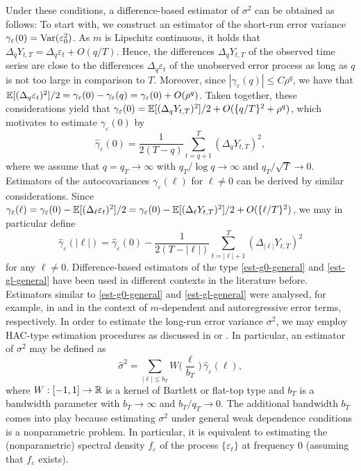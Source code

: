 Under these conditions, a difference-based estimator of $\sigma^2$ can be obtained as follows: To start with, we construct an estimator of the short-run error variance $\gamma_\varepsilon(0) = \textnormal{Var}(\varepsilon_0^2)$. As $m$ is Lipschitz continuous, it holds that $\Delta_q Y_{t,T} = \Delta_q \varepsilon_t + O(q/T)$. Hence, the differences $\Delta_q Y_{t,T}$ of the observed time series are close to the differences $\Delta_q \varepsilon_t$ of the unobserved error process as long as $q$ is not too large in comparison to $T$. Moreover, since $|\gamma_\varepsilon(q)| \le C \rho^{q}$, we have that $\mathbb{E}[(\Delta_q \varepsilon_t)^2]/2 = \gamma_\varepsilon(0) - \gamma_\varepsilon(q) = \gamma_\varepsilon(0) + O(\rho^q)$. Taken together, these considerations yield that $\gamma_\varepsilon(0) = \mathbb{E}[(\Delta_q Y_{t,T})^2]/2 + O(\{q/T\}^2 + \rho^q)$, which motivates to estimate $\gamma_\varepsilon(0)$ by  
\begin{equation}\label{est-g0-general}
\widehat{\gamma}_\varepsilon(0) = \frac{1}{2(T-q)} \sum\limits_{t=q+1}^T (\Delta_q Y_{t,T})^2,
\end{equation}
where we assume that $q = q_T \rightarrow \infty$ with $q_T/\log q \rightarrow \infty$ and $q_T/\sqrt{T} \rightarrow 0$. Estimators of the autocovariances $\gamma_\varepsilon(\ell)$ for $\ell \ne 0$ can be derived by similar considerations. Since $\gamma_\varepsilon(\ell) = \gamma_\varepsilon(0) - \mathbb{E}[(\Delta_\ell \varepsilon_t)^2]/2 = \gamma_\varepsilon(0) - \mathbb{E}[(\Delta_\ell Y_{t,T})^2]/2 + O(\{\ell/T\}^2)$, we may in particular define  
\begin{equation}\label{est-gl-general}
\widehat{\gamma}_\varepsilon(|\ell|) = \widehat{\gamma}_\varepsilon(0) - \frac{1}{2(T-|\ell|)} \sum\limits_{t=|\ell|+1}^T (\Delta_{|\ell|} Y_{t,T} )^2
\end{equation}
for any $\ell \ne 0$. Difference-based estimators of the type \eqref{est-g0-general} and \eqref{est-gl-general} have been used in different contexts in the literature before. Estimators similar to \eqref{est-g0-general} and \eqref{est-gl-general} were analysed, for example, in \cite{MuellerStadtmueller1988} and \cite{Hall2003} in the context of $m$-dependent and autoregressive error terms, respectively. In order to estimate the long-run error variance $\sigma^2$, we may employ HAC-type estimation procedures as discussed in \cite{Andrews1991} or \cite{DeJong2000}. In particular, an estimator of $\sigma^2$ may be defined as 
\begin{equation}\label{est-lrv-general}
\widehat{\sigma}^2 = \sum_{|\ell| \le b_T} W \Big( \frac{\ell}{b_T} \Big) \, \widehat{\gamma}_\varepsilon(\ell), 
\end{equation}
where $W: [-1,1] \rightarrow \mathbb{R}$ is a kernel of Bartlett or flat-top type and $b_T$ is a bandwidth parameter with $b_T \rightarrow \infty$ and $b_T/q_T \rightarrow 0$. The additional bandwidth $b_T$ comes into play because estimating $\sigma^2$ under general weak dependence conditions is a nonparametric problem. In particular, it is equivalent to estimating the (nonparametric) spectral density $f_\varepsilon$ of the process $\{\varepsilon_t\}$ at frequency $0$ (assuming that $f_\varepsilon$ exists). 


